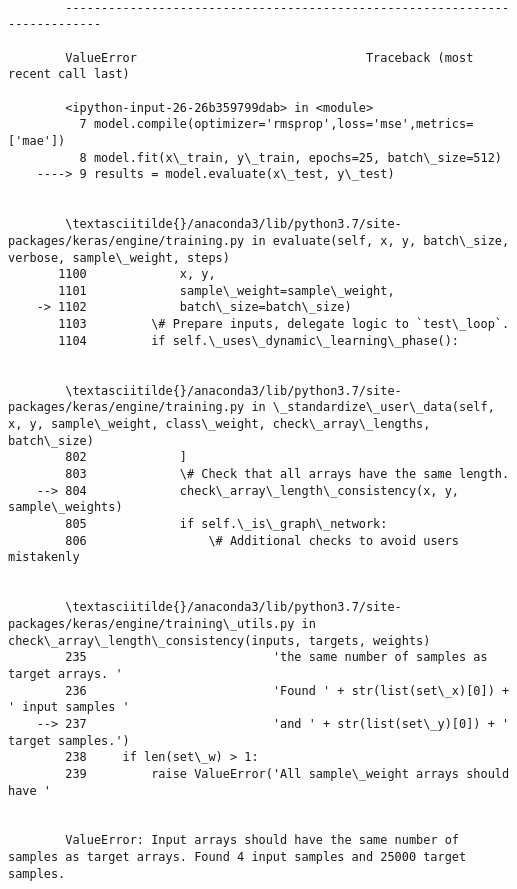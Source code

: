 \documentclass[11pt]{article}
\begin{document}
    \begin{Verbatim}[commandchars=\\\{\}]

        ---------------------------------------------------------------------------

        ValueError                                Traceback (most recent call last)

        <ipython-input-26-26b359799dab> in <module>
          7 model.compile(optimizer='rmsprop',loss='mse',metrics=['mae'])
          8 model.fit(x\_train, y\_train, epochs=25, batch\_size=512)
    ----> 9 results = model.evaluate(x\_test, y\_test)
    

        \textasciitilde{}/anaconda3/lib/python3.7/site-packages/keras/engine/training.py in evaluate(self, x, y, batch\_size, verbose, sample\_weight, steps)
       1100             x, y,
       1101             sample\_weight=sample\_weight,
    -> 1102             batch\_size=batch\_size)
       1103         \# Prepare inputs, delegate logic to `test\_loop`.
       1104         if self.\_uses\_dynamic\_learning\_phase():


        \textasciitilde{}/anaconda3/lib/python3.7/site-packages/keras/engine/training.py in \_standardize\_user\_data(self, x, y, sample\_weight, class\_weight, check\_array\_lengths, batch\_size)
        802             ]
        803             \# Check that all arrays have the same length.
    --> 804             check\_array\_length\_consistency(x, y, sample\_weights)
        805             if self.\_is\_graph\_network:
        806                 \# Additional checks to avoid users mistakenly


        \textasciitilde{}/anaconda3/lib/python3.7/site-packages/keras/engine/training\_utils.py in check\_array\_length\_consistency(inputs, targets, weights)
        235                          'the same number of samples as target arrays. '
        236                          'Found ' + str(list(set\_x)[0]) + ' input samples '
    --> 237                          'and ' + str(list(set\_y)[0]) + ' target samples.')
        238     if len(set\_w) > 1:
        239         raise ValueError('All sample\_weight arrays should have '


        ValueError: Input arrays should have the same number of samples as target arrays. Found 4 input samples and 25000 target samples.

    \end{Verbatim}
\end{document}

